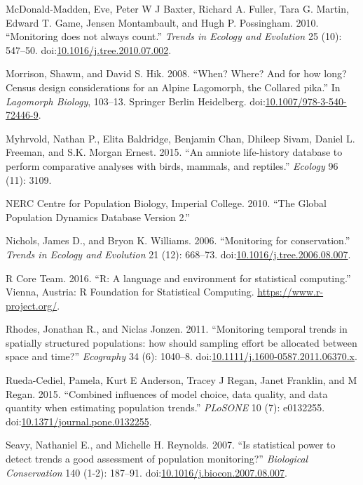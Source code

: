 \documentclass[12pt,]{article}
\begin{document}
\hypertarget{ref-McDonald-Madden2010}{}
McDonald-Madden, Eve, Peter W J Baxter, Richard A. Fuller, Tara G.
Martin, Edward T. Game, Jensen Montambault, and Hugh P. Possingham.
2010. ``Monitoring does not always count.'' \emph{Trends in Ecology and
Evolution} 25 (10): 547--50.
doi:\href{https://doi.org/10.1016/j.tree.2010.07.002}{10.1016/j.tree.2010.07.002}.

\hypertarget{ref-Morrison2008}{}
Morrison, Shawm, and David S. Hik. 2008. ``When? Where? And for how
long? Census design considerations for an Alpine Lagomorph, the Collared
pika.'' In \emph{Lagomorph Biology}, 103--13. Springer Berlin
Heidelberg.
doi:\href{https://doi.org/10.1007/978-3-540-72446-9}{10.1007/978-3-540-72446-9}.

\hypertarget{ref-Myhrvold2015}{}
Myhrvold, Nathan P., Elita Baldridge, Benjamin Chan, Dhileep Sivam,
Daniel L. Freeman, and S.K. Morgan Ernest. 2015. ``An amniote
life-history database to perform comparative analyses with birds,
mammals, and reptiles.'' \emph{Ecology} 96 (11): 3109.

\hypertarget{ref-GPDD2010}{}
NERC Centre for Population Biology, Imperial College. 2010. ``The Global
Population Dynamics Database Version 2.''

\hypertarget{ref-Nichols2006}{}
Nichols, James D., and Bryon K. Williams. 2006. ``Monitoring for
conservation.'' \emph{Trends in Ecology and Evolution} 21 (12): 668--73.
doi:\href{https://doi.org/10.1016/j.tree.2006.08.007}{10.1016/j.tree.2006.08.007}.

\hypertarget{ref-RCoreTeam2016}{}
R Core Team. 2016. ``R: A language and environment for statistical
computing.'' Vienna, Austria: R Foundation for Statistical Computing.
\url{https://www.r-project.org/}.

\hypertarget{ref-Rhodes2011}{}
Rhodes, Jonathan R., and Niclas Jonzen. 2011. ``Monitoring temporal
trends in spatially structured populations: how should sampling effort
be allocated between space and time?'' \emph{Ecography} 34 (6): 1040--8.
doi:\href{https://doi.org/10.1111/j.1600-0587.2011.06370.x}{10.1111/j.1600-0587.2011.06370.x}.

\hypertarget{ref-Rueda-Cediel2015}{}
Rueda-Cediel, Pamela, Kurt E Anderson, Tracey J Regan, Janet Franklin,
and M Regan. 2015. ``Combined influences of model choice, data quality,
and data quantity when estimating population trends.'' \emph{PLoSONE} 10
(7): e0132255.
doi:\href{https://doi.org/10.1371/journal.pone.0132255}{10.1371/journal.pone.0132255}.

\hypertarget{ref-Seavy2007}{}
Seavy, Nathaniel E., and Michelle H. Reynolds. 2007. ``Is statistical
power to detect trends a good assessment of population monitoring?''
\emph{Biological Conservation} 140 (1-2): 187--91.
doi:\href{https://doi.org/10.1016/j.biocon.2007.08.007}{10.1016/j.biocon.2007.08.007}.
\end{document}
